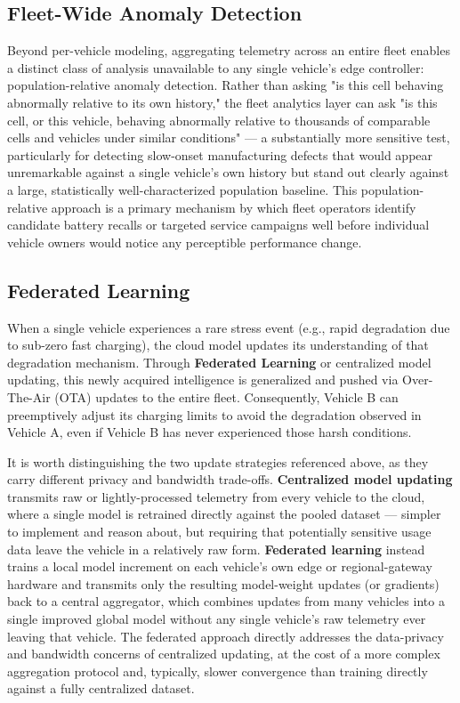 \subsection{Fleet-Wide Anomaly Detection}
\label{subsec:15_fleet_anomaly}

Beyond per-vehicle modeling, aggregating telemetry across an entire fleet enables a distinct class of analysis unavailable to any single vehicle's edge controller: population-relative anomaly detection. Rather than asking "is this cell behaving abnormally relative to its own history," the fleet analytics layer can ask "is this cell, or this vehicle, behaving abnormally relative to thousands of comparable cells and vehicles under similar conditions" — a substantially more sensitive test, particularly for detecting slow-onset manufacturing defects that would appear unremarkable against a single vehicle's own history but stand out clearly against a large, statistically well-characterized population baseline. This population-relative approach is a primary mechanism by which fleet operators identify candidate battery recalls or targeted service campaigns well before individual vehicle owners would notice any perceptible performance change.

\subsection{Federated Learning}
\label{subsec:15_federated_learning_full}

When a single vehicle experiences a rare stress event (e.g., rapid degradation due to sub-zero fast charging), the cloud model updates its understanding of that degradation mechanism. Through \textbf{Federated Learning} or centralized model updating, this newly acquired intelligence is generalized and pushed via Over-The-Air (OTA) updates to the entire fleet. Consequently, Vehicle B can preemptively adjust its charging limits to avoid the degradation observed in Vehicle A, even if Vehicle B has never experienced those harsh conditions.

It is worth distinguishing the two update strategies referenced above, as they carry different privacy and bandwidth trade-offs. \textbf{Centralized model updating} transmits raw or lightly-processed telemetry from every vehicle to the cloud, where a single model is retrained directly against the pooled dataset — simpler to implement and reason about, but requiring that potentially sensitive usage data leave the vehicle in a relatively raw form. \textbf{Federated learning} instead trains a local model increment on each vehicle's own edge or regional-gateway hardware and transmits only the resulting model-weight updates (or gradients) back to a central aggregator, which combines updates from many vehicles into a single improved global model without any single vehicle's raw telemetry ever leaving that vehicle. The federated approach directly addresses the data-privacy and bandwidth concerns of centralized updating, at the cost of a more complex aggregation protocol and, typically, slower convergence than training directly against a fully centralized dataset.

